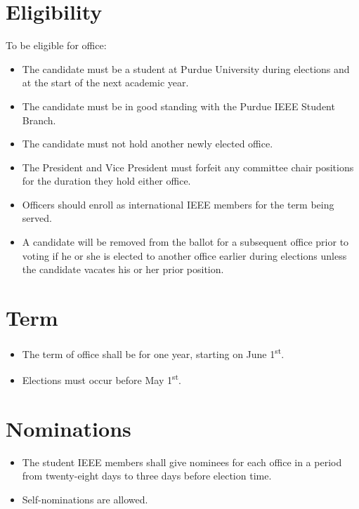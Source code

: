 \documentclass[12pt]{constitution}
\newcommand{\datetermstart}{June 1\textsuperscript{st}} %
\newcommand{\dateelectionsheld}{May 1\textsuperscript{st}} %
\begin{document}
\section{Eligibility}
\label{sec:elect_elig}
To be eligible for office:
\begin{itemize}
    \item The candidate must be a student at Purdue University during elections and at the start of the next academic year.
    \item The candidate must be in good standing with the Purdue IEEE Student Branch.
    \item The candidate must not hold another newly elected office.
    \item The President and Vice President must forfeit any committee chair positions for the duration they hold either office.
    \item Officers should enroll as international IEEE members for the term being served.
    \item A candidate will be removed from the ballot for a subsequent office prior to voting if he or she is elected to another office earlier during elections unless the candidate vacates his or her prior position.    
\end{itemize}

\section{Term}
\label{sec:elect_term}
\begin{itemize}
    \item The term of office shall be for one year, starting on \datetermstart{}.
    \item Elections must occur before \dateelectionsheld{}.
\end{itemize}

\section{Nominations}
\label{sec:elect_nom}
\begin{itemize}
    \item The student IEEE members shall give nominees for each office in a period from twenty-eight days to three days before election time.
    \item Self-nominations are allowed.
\end{itemize}
\end{document}
